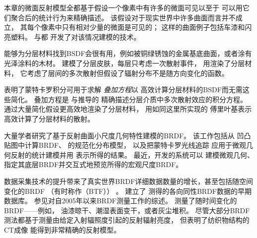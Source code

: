 本章的微面反射模型全都基于假设一个像素中有许多的微面可见以至于
可以用它们聚合后的统计行为来精确描述。
该假设对于现实世界中许多曲面而言并不成立，
其每个像素中只有相对少量的微面是可见的；
这样的曲面例子包括车漆和闪亮塑料。
\citet{10.1145/2601097.2601155}与\citet{10.1145/2601097.2601186}都
开发了对该情况建模的技术。

能够为分层材料找到BSDF会很有用，例如被铜绿锈蚀的金属基底曲面，或者涂有光泽涂料的木材。
\citet{10.1145/166117.166139}建模了分层皮肤，每层只考虑一次散射事件，
\citet{10.1145/237170.237278}用渲染了分层材料，
它考虑了层间的多次散射但假设了辐射分布不是随方向变化的函数。

\citet{10.1145/344779.344824}表明了蒙特卡罗积分可用于求解
\emph{叠加方程}以
高效计算分层材料的BSDF而无需这些简化。
叠加方程是\citet{10.1016/B978-0-12-710701-1.50002-1}
与\citet{MatrixMethodsforMultipleScatteringProblems}推导的
精确描述分层介质中多次散射效应的积分方程。
\citet{10.1145/1321261.1321292}通过大量简化假设更高效地渲染了分层材料，
\citet{10.1145/2601097.2601139}用如同这里所实现的
傅里叶基表示高效计算了分层材料的散射。

大量学者研究了基于反射曲面小尺度几何特性建模的BRDF。
该工作包括\citet{10.1145/37401.37434}从
凹凸贴图中计算BRDF、
\citet{fournier1992normal}的规范化分布模型，
以及\citet{10.1145/133994.134075}把蒙特卡罗光线追踪
应用于微观几何反射的统计建模并用
表示所得的结果。
最近，\citet{10.1145/2070781.2024179}开发的系统可以
建模微观几何、指定其底层BRDF并交互式地预览所得的宏观尺度BRDF。

数据采集技术的提升带来了真实世界BRDF详细数据数量的增长，甚至包括随空间变化的BRDF
（有时称作（BTF））
\citep{10.1145/300776.300778}。
\citet{10.5555/882404.882439,10.1145/882262.882343}建立了
测得的各向同性BRDF数据的早期数据库。
参见\citet{10.1111/j.1467-8659.2005.00830.x}对自2005年以来BRDF测量工作的综述。
\citet{10720740}测量了随时间变化的BRDF——例如，
油漆晾干、潮湿表面变干，或者灰尘堆积。
尽管大部分BRDF测法都基于测量由给定入射辐照度引起的反射辐射亮度，
但\citet{10.1145/2010324.1964939}表明了纺织物结构的CT成像
能得到非常精确的反射模型。


